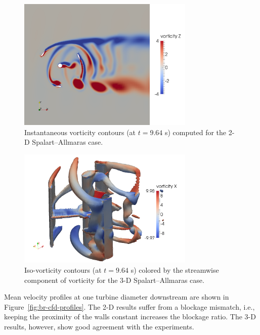 \documentclass[aip,graphicx]{revtex4-1}
\begin{document}
\begin{figure}
    \centering

    \includegraphics[width=0.75\textwidth]{2D_vorticity_SA_964}

    \caption{Instantaneous vorticity contours (at $t=9.64$ s) computed for the
        2-D Spalart--Allmaras case.}

    \label{fig:br-vorticity-2d}
\end{figure}

\begin{figure}
    \centering

    \includegraphics[width=0.75\textwidth]{3D_vorticity_SA_964_10-threshold}

    \caption{Iso-vorticity contours (at $t=9.64$ s) colored by the streamwise
        component of vorticity for the 3-D Spalart--Allmaras case.}

    \label{fig:br-vorticity-3d}
\end{figure}

Mean velocity profiles at one turbine diameter downstream are shown in
Figure~\ref{fig:br-cfd-profiles}. The 2-D results suffer from a blockage
mismatch, i.e., keeping the proximity of the walls constant increases the
blockage ratio. The 3-D results, however, show good agreement with the
experiments.
\end{document}

